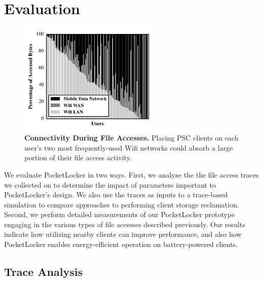 
\section{Evaluation}
\label{sec-evaluation}

\begin{figure}

  \vspace*{-0.6in}

  \includegraphics[width=0.6\textwidth]{./figures/pocketlocker/ConnectivityPercentageGraph.pdf}
  
  \vspace*{-0.1in}

  \caption{\small \textbf{Connectivity During File Accesses.} Placing PSC
    clients on each user's two most frequently-used Wifi networks could absorb a
  large portion of their file access activity.}
  
  \vspace*{-0.2in}

  \label{fig-simulation-connectivity}

\end{figure}

We evaluate PocketLocker in two ways. First, we analyze the the file access
traces we collected on \PhoneLab{} to determine the impact of parameters
important to PocketLocker's design. We also use the traces as inputs to a
trace-based simulation to compare approaches to performing client storage
reclamation. Second, we perform detailed measurements of our PocketLocker
prototype engaging in the various types of file accesses described previously.
Our results indicate how utilizing nearby clients can improve performance, and
also how PocketLocker enables energy-efficient operation on battery-powered
clients.

\subsection{Trace Analysis}
\label{subsec-evaluation-traces}

